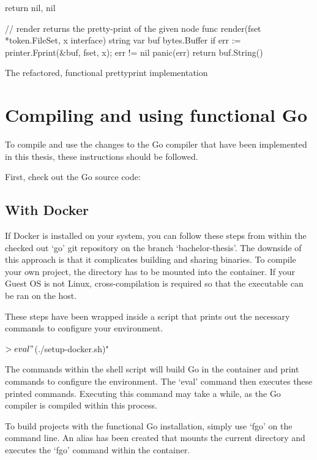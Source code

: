 \begin{code}
\begin{gocode}
{	return nil, nil
}

// render returns the pretty-print of the given node
func render(fset *token.FileSet, x interface{}) string {
	var buf bytes.Buffer
	if err := printer.Fprint(&buf, fset, x); err != nil {
		panic(err)
	}
	return buf.String()
}
	\end{gocode}
	\caption{The refactored, functional prettyprint implementation}
\end{code}

\section{Compiling and using functional Go}\label{appendix:install-fgo}

To compile and use the changes to the Go compiler that have been implemented in
this thesis, these instructions should be followed.

First, check out the Go source code:


\subsection{With Docker}

If Docker is installed on your system, you can follow these steps from within
the checked out `go' git repository on the branch `bachelor-thesis'.
The downside of this approach is that it complicates building and sharing binaries.
To compile your own project, the directory has to be mounted into the container.
If your Guest OS is not Linux, cross-compilation is required so that the executable
can be ran on the host.

These steps have been wrapped inside a script that prints out the necessary commands
to configure your environment.

\begin{bashcode}
$> eval "$(./setup-docker.sh)"
\end{bashcode}
The commands within the shell script will
build Go in the container and print commands to configure the environment. The `eval'
command then executes these printed commands. Executing this command may take a while,
as the Go compiler is compiled within this process.

To build projects with the functional Go installation, simply use `fgo' on the command line.
An alias has been created that mounts the current directory and executes the `fgo'
command within the container.

